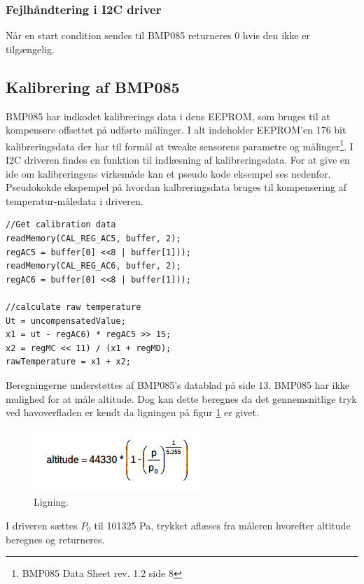 \subsubsection{Fejlhåndtering i I2C driver}
Når en start condition sendes til BMP085 returneres 0 hvis den ikke er tilgængelig.

\subsection{Kalibrering af BMP085}
BMP085 har indkodet kalibrerings data i dens EEPROM, som bruges til at kompensere offsettet på udførte målinger. I alt indeholder EEPROM’en 176 bit kalibreringsdata der har til formål at tweake sensorens parametre og målinger\footnote{BMP085 Data Sheet rev. 1.2 side 8}. I I2C driveren findes en funktion til indlæsning af kalibreringsdata.
For at give en ide om kalibreringens virkemåde kan et pseudo kode eksempel ses nedenfor. 
Pseudokokde ekspempel på hvordan kalbreringsdata bruges til kompensering af temperatur-måledata i driveren.

\begin{lstlisting}
//Get calibration data
readMemory(CAL_REG_AC5, buffer, 2);
regAC5 = buffer[0] <<8 | buffer[1]));
readMemory(CAL_REG_AC6, buffer, 2);
regAC6 = buffer[0] <<8 | buffer[1]));

//calculate raw temperature
Ut = uncompensatedValue;
x1 = ut - regAC6) * regAC5 >> 15;
x2 = regMC << 11) / (x1 + regMD);
rawTemperature = x1 + x2;
\end{lstlisting}

Beregningerne understøttes af BMP085’s datablad på side 13.
BMP085 har ikke mulighed for at måle altitude. Dog kan dette beregnes da det gennemsnitlige tryk ved havoverfladen er kendt da ligningen på figur \ref{fig:equation} er givet.

\begin{figure}[h]
	\centering
	\includegraphics[width=0.45\linewidth]{figs/equation}
	\caption{Ligning.}
	\label{fig:equation}
\end{figure}

I driveren sættes $P_0$ til 101325 Pa, trykket aflæses fra måleren hvorefter altitude beregnes og returneres. 

